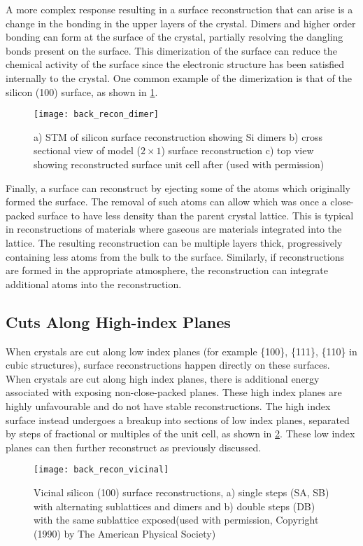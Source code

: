 A more complex response resulting in a surface reconstruction that can arise is a change in the bonding in the upper layers of the crystal.
Dimers and higher order bonding can form at the surface of the crystal, partially resolving the dangling bonds present on the surface.
This dimerization of the surface can reduce the chemical activity of the surface since the electronic structure has been satisfied internally to the crystal\cite{Duke1996}.
One common example of the dimerization is that of the silicon (100) surface, as shown in \cref{fig:back_recon_dimer}.
\begin{figure}
 \centering \texttt{[image: back\_recon\_dimer]}
 \caption[Silicon dimer surface reconstruction]{\label{fig:back_recon_dimer}a) STM of silicon surface reconstruction showing Si dimers b) cross sectional view of model (\(2 \times 1\)) surface reconstruction c) top view showing reconstructed surface unit cell after \cite{Zhang1997,Lagally1993}(used with permission)}
\end{figure}

Finally, a surface can reconstruct by ejecting some of the atoms which originally formed the surface.
The removal of such atoms can allow which was once a close-packed surface to have less density than the parent crystal lattice.
This is typical in reconstructions of materials where gaseous are materials integrated into the lattice.
The resulting reconstruction can be multiple layers thick, progressively containing less atoms from the bulk to the surface.
Similarly, if reconstructions are formed in the appropriate atmosphere, the reconstruction can integrate additional atoms into the reconstruction.

\subsection{Cuts Along High-index Planes} When crystals are cut along low index planes (for example \{100\}, \{111\}, \{110\}  in cubic structures), surface reconstructions happen directly on these surfaces.
When crystals are cut along high index planes, there is additional energy associated with exposing non-close-packed planes.
These high index planes are highly unfavourable and do not have stable reconstructions.
The high index surface instead undergoes a breakup into sections of low index planes, separated by steps of fractional or multiples of the unit cell, as shown in \cref{fig:back_recon_vicinal}.
These low index planes can then further reconstruct as previously discussed.
\begin{figure}
 \centering \texttt{[image: back\_recon\_vicinal]}
 \caption[Silicon single and double step surface reconstructions]{\label{fig:back_recon_vicinal}Vicinal silicon (100) surface reconstructions, a) single steps (SA, SB) with alternating sublattices and dimers and b) double steps (DB) with the same sublattice exposed\cite{Alerhand1990}(used with permission, Copyright (1990) by The American Physical Society)}
\end{figure}

